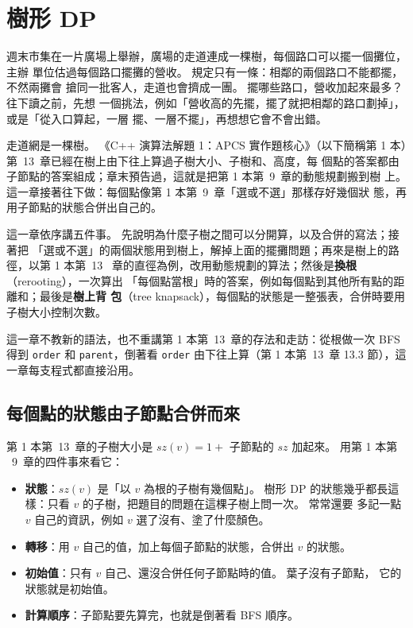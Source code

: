 \chapter{樹形 DP}
\label{ch:treedp}


週末市集在一片廣場上舉辦，廣場的走道連成一棵樹，每個路口可以擺一個攤位，主辦
單位估過每個路口擺攤的營收。 規定只有一條：相鄰的兩個路口不能都擺，不然兩攤會
搶同一批客人，走道也會擠成一團。 擺哪些路口，營收加起來最多？ 往下讀之前，先想
一個挑法，例如「營收高的先擺，擺了就把相鄰的路口劃掉」，或是「從入口算起，一層
擺、一層不擺」，再想想它會不會出錯。

走道網是一棵樹。 《C++ 演算法解題 1：APCS 實作題核心》（以下簡稱第 1 本）第~13~章已經在樹上由下往上算過子樹大小、子樹和、高度，每
個點的答案都由子節點的答案組成；章末預告過，這就是把第 1 本第~9~章的動態規劃搬到樹
上。 這一章接著往下做：每個點像第 1 本第~9~章「選或不選」那樣存好幾個狀
態，再用子節點的狀態合併出自己的。

這一章依序講五件事。 先說明為什麼子樹之間可以分開算，以及合併的寫法；接著把
「選或不選」的兩個狀態用到樹上，解掉上面的擺攤問題；再來是樹上的路徑，以第 1 本第~13
~章的直徑為例，改用動態規劃的算法；然後是\textbf{換根}（rerooting），一次算出
「每個點當根」時的答案，例如每個點到其他所有點的距離和；最後是\textbf{樹上背
包}（tree knapsack），每個點的狀態是一整張表，合併時要用子樹大小控制次數。

這一章不教新的語法，也不重講第 1 本第~13~章的存法和走訪：從根做一次 BFS 得到
\texttt{order} 和 \texttt{parent}，倒著看 \texttt{order} 由下往上算（第 1 本第~13~章
13.3 節），這一章每支程式都直接沿用。

\section{每個點的狀態由子節點合併而來}
\label{sec:tdp-merge}

第 1 本第~13~章的子樹大小是 $\mathit{sz}(v) = 1 + $ 子節點的 $\mathit{sz}$ 加起來。 用第 1 本第
~9~章的四件事來看它：

\begin{itemize}
\item \textbf{狀態}：$\mathit{sz}(v)$ 是「以 $v$ 為根的子樹有幾個點」。 樹形 DP
的狀態幾乎都長這樣：只看 $v$ 的子樹，把題目的問題在這棵子樹上問一次。 常常還要
多記一點 $v$ 自己的資訊，例如 $v$ 選了沒有、塗了什麼顏色。
\item \textbf{轉移}：用 $v$ 自己的值，加上每個子節點的狀態，合併出 $v$ 的狀態。
\item \textbf{初始值}：只有 $v$ 自己、還沒合併任何子節點時的值。 葉子沒有子節點，
它的狀態就是初始值。
\item \textbf{計算順序}：子節點要先算完，也就是倒著看 BFS 順序。
\end{itemize}

